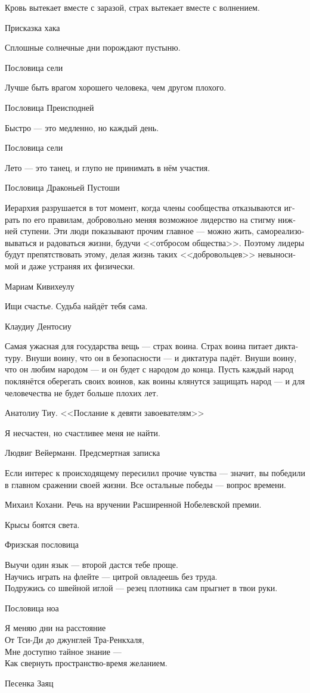 \documentclass[a4paper,12pt,fleqn]{book}\usepackage{polyglossia}\setdefaultlanguage[babelshorthands=true]{russian}\setotherlanguage{english}\defaultfontfeatures{Ligatures=TeX,Mapping=tex-text}\usepackage{xcolor}\newcommand{\ml}[3]{#2}
\begin{document}
{\epigraph
{Кровь вытекает вместе с заразой, страх вытекает вместе с волнением.}
{Присказка хака}

\epigraph
{Сплошные солнечные дни порождают пустыню.}
{Пословица сели}

\epigraph
{Лучше быть врагом хорошего человека, чем другом плохого.}
{Пословица Преисподней}

\epigraph
{Быстро --- это медленно, но каждый день.}
{Пословица сели}

\epigraph
{Лето --- это танец, и глупо не принимать в нём участия.}
{Пословица Драконьей Пустоши}

\epigraph
{Иерархия разрушается в тот момент, когда члены сообщества отказываются играть по его правилам, добровольно меняя возможное лидерство на стигму нижней ступени.
Эти люди показывают прочим главное --- можно жить, самореализовываться и радоваться жизни, будучи <<отбросом общества>>.
Поэтому лидеры будут препятствовать этому, делая жизнь таких <<добровольцев>> невыносимой и даже устраняя их физически.}
{Мариам Кивихеулу}

\epigraph
{Ищи счастье.
Судьба найдёт тебя сама.}
{Клаудиу Дентосиу}

\epigraph
{Самая ужасная для государства вещь --- страх воина.
Страх воина питает диктатуру.
Внуши воину, что он в безопасности --- и диктатура падёт.
Внуши воину, что он любим народом --- и он будет с народом до конца.
Пусть каждый народ поклянётся оберегать своих воинов, как воины клянутся защищать народ --- и для человечества не будет больше плохих лет.}
{Анатолиу Тиу.
<<Послание к девяти завоевателям>>}

\epigraph
{Я несчастен, но счастливее меня не найти.}
{Людвиг Вейерманн.
Предсмертная записка}

\epigraph
{Если интерес к происходящему пересилил прочие чувства --- значит, вы победили в главном сражении своей жизни.
Все остальные победы --- вопрос времени.}
{Михаил Кохани.
Речь на вручении Расширенной Нобелевской премии.}

\epigraph
{Крысы боятся света.}
{Фризская пословица}

\epigraph
{Выучи один язык --- второй дастся тебе проще.\\
Научись играть на флейте --- цитрой овладеешь без труда.\\
Подружись со швейной иглой --- резец плотника сам прыгнет в твои руки.}
{Пословица ноа}

\epigraph
{Я меняю дни на расстояние\\
От Тси-Ди до джунглей Тра-Ренкхаля,\\
Мне доступно тайное знание ---\\
Как свернуть пространство-время желанием.}
{Песенка Заяц}

}
\end{document}
